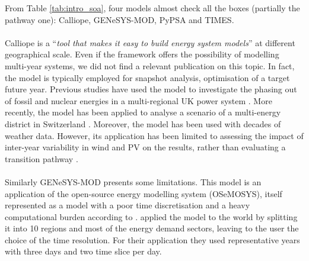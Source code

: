 From Table \ref{tab:intro_soa}, four models almost check all the boxes (partially the pathway one): Calliope, GENeSYS-MOD, PyPSA and TIMES. \\

\\

\noindent
Calliope is a ``\emph{tool that makes it easy to build energy system models}'' at different geographical scale. Even if the framework offers the possibility of modelling multi-year systems, we did not find a relevant publication on this topic. In fact, the model is typically employed for snapshot analysis, \ie optimisation of a target future year. Previous studies have used the model to investigate the phasing out of fossil and nuclear energies in a multi-regional UK power system \cite{pfenninger2015renewables}. More recently, the model has been applied to analyse a scenario of a multi-energy district in Switzerland \cite{pickering2021quantifying}. Moreover, the model has been used with decades of weather data. However, its application has been limited to assessing the impact of inter-year variability in wind and PV on the results, 
rather than evaluating a transition pathway \cite{pfenninger2017dealing}. \\

\\

\noindent
Similarly GENeSYS-MOD presents some limitations. This model is an application of the open-source energy modelling system (OSeMOSYS), itself represented as a model with a poor time discretisation and a heavy computational burden according to \cite{prina2019transition}. \citet{loffler2017designing} applied the model to the world by splitting it into 10 regions and most of the energy demand sectors, leaving to the user the choice of the time resolution.  For their application they used representative years with three days and two time slice per day. \\

